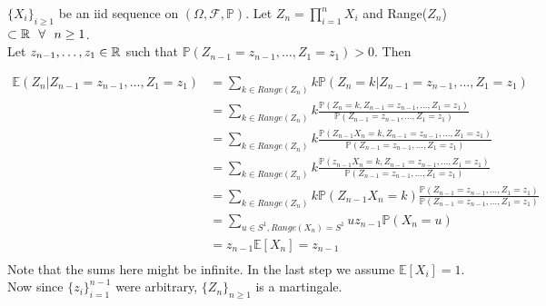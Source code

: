\documentclass[main]{subfiles}
\begin{document}
\ex $\{X_i\}_{i \geq 1}$ be an iid sequence on $(\Omega, \mathcal{F}, \mathbb{P})$. Let
$Z_n= \prod_{i=1}^n X_i$
and Range($Z_n$) $\subset \mathbb R ~~\forall ~~ n \geq 1$. \\
Let $z_{n-1}, \ldots, z_1 \in \mathbb R$ such that $\mathbb{P} (Z_{n-1}=z_{n-1}, \ldots, Z_1=z_1)>0$. Then

\begin{align*}
    \mathbb{E} (Z_n |Z_{n-1}=z_{n-1}, \ldots, Z_1=z_1) & = \sum_{k \in Range(Z_n)} k \mathbb{P} (Z_n=k |Z_{n-1}=z_{n-1}, \ldots, Z_1=z_1)                                                                           \\
                                                       & = \sum_{k \in Range(Z_n)} k \frac{\mathbb{P} (Z_n=k ,Z_{n-1}=z_{n-1}, \ldots, Z_1=z_1)}{\mathbb{P} (Z_{n-1}=z_{n-1}, \ldots, Z_1=z_1)}                     \\
                                                       & =  \sum_{k \in Range(Z_n)} k \frac{\mathbb{P} (Z_{n-1}X_n=k ,Z_{n-1}=z_{n-1}, \ldots, Z_1=z_1)}{\mathbb{P} (Z_{n-1}=z_{n-1}, \ldots, Z_1=z_1)}             \\
                                                       & =  \sum_{k \in Range(Z_n)} k \frac{\mathbb{P} (z_{n-1}X_n=k ,Z_{n-1}=z_{n-1}, \ldots, Z_1=z_1)}{\mathbb{P} (Z_{n-1}=z_{n-1}, \ldots, Z_1=z_1)}             \\
                                                       & =  \sum_{k \in Range(Z_n)} k \mathbb{P}(Z_{n-1}X_n=k ) \frac{\mathbb{P} (Z_{n-1}=z_{n-1}, \ldots, Z_1=z_1)}{\mathbb{P} (Z_{n-1}=z_{n-1}, \ldots, Z_1=z_1)} \\
                                                       & = \sum_{u \in S^1, Range(X_n)=S^1} u z_{n-1} \mathbb{P} (X_n=u)                                                                                            \\
                                                       & = z_{n-1} \mathbb{E} [X_n] =z_{n-1}                                                                                                                        \\
\end{align*}
Note that the sums here might be infinite. In the last step we assume $\mathbb{E}[X_i]=1$. Now since $\{z_i\}_{i=1}^{n-1}$ were arbitrary, $\{Z_n\}_{n \geq 1}$ is a martingale. \\
\end{document}
